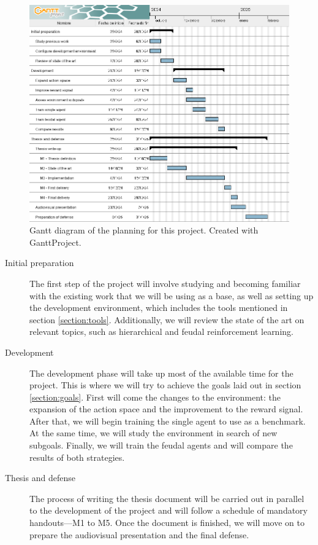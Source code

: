 \begin{figure}[!h]
    \centering
    \includegraphics[width=.9\textwidth]{figs/TFM_Gannt.png}
    \caption{Gantt diagram of the planning for this project. Created with GanttProject\protect\footnotemark.}
    \label{fig:gantt}
\end{figure}

\begin{description}
    \item[Initial preparation] The first step of the project will involve studying and becoming familiar with the existing work that we will be using as a base, as well as setting up the development environment, which includes the tools mentioned in section \ref{section:tools}. Additionally, we will review the state of the art on relevant topics, such as hierarchical and feudal reinforcement learning.
    \item[Development] The development phase will take up most of the available time for the project. This is where we will try to achieve the goals laid out in section \ref{section:goals}. First will come the changes to the environment: the expansion of the action space and the improvement to the reward signal. After that, we will begin training the single agent to use as a benchmark. At the same time, we will study the environment in search of new subgoals. Finally, we will train the feudal agents and will compare the results of both strategies.
    \item[Thesis and defense] The process of writing the thesis document will be carried out in parallel to the development of the project and will follow a schedule of mandatory handouts---M1 to M5. Once the document is finished, we will move on to prepare the audiovisual presentation and the final defense.
\end{description}